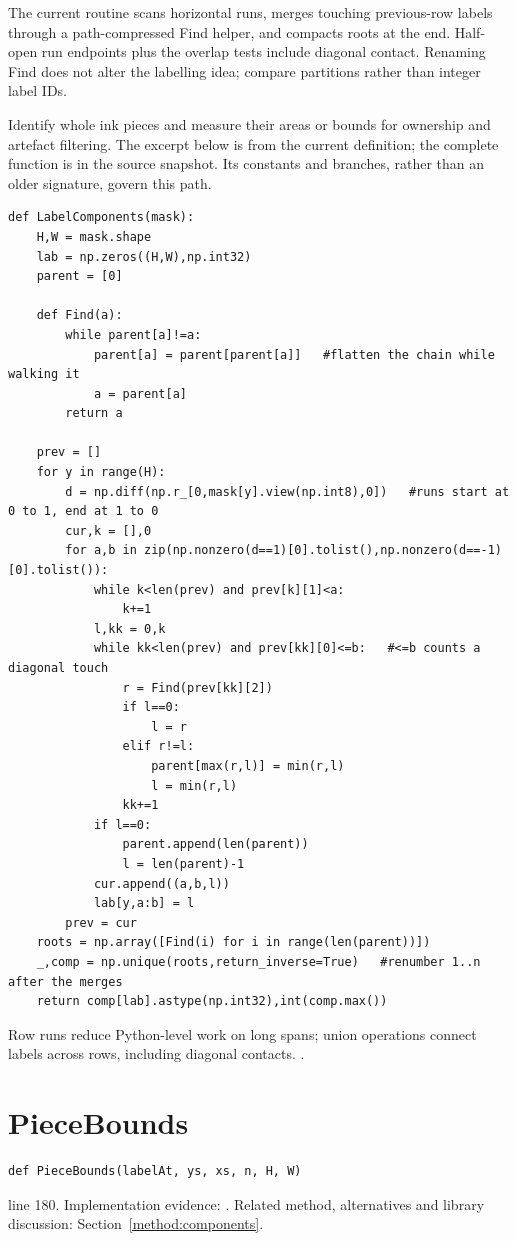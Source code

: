 The current routine scans horizontal runs, merges touching previous-row labels through a path-compressed Find helper, and compacts roots at the end. Half-open run endpoints plus the overlap tests include diagonal contact. Renaming Find does not alter the labelling idea; compare partitions rather than integer label IDs.


Identify whole ink pieces and measure their areas or bounds for ownership and artefact filtering. The excerpt below is from the current definition; the complete function is in the source snapshot. Its constants and branches, rather than an older signature, govern this path.


\begin{lstlisting}[style=plain]
def LabelComponents(mask):
    H,W = mask.shape
    lab = np.zeros((H,W),np.int32)
    parent = [0]

    def Find(a):
        while parent[a]!=a:
            parent[a] = parent[parent[a]]   #flatten the chain while walking it
            a = parent[a]
        return a

    prev = []
    for y in range(H):
        d = np.diff(np.r_[0,mask[y].view(np.int8),0])   #runs start at 0 to 1, end at 1 to 0
        cur,k = [],0
        for a,b in zip(np.nonzero(d==1)[0].tolist(),np.nonzero(d==-1)[0].tolist()):
            while k<len(prev) and prev[k][1]<a:
                k+=1
            l,kk = 0,k
            while kk<len(prev) and prev[kk][0]<=b:   #<=b counts a diagonal touch
                r = Find(prev[kk][2])
                if l==0:
                    l = r
                elif r!=l:
                    parent[max(r,l)] = min(r,l)
                    l = min(r,l)
                kk+=1
            if l==0:
                parent.append(len(parent))
                l = len(parent)-1
            cur.append((a,b,l))
            lab[y,a:b] = l
        prev = cur
    roots = np.array([Find(i) for i in range(len(parent))])
    _,comp = np.unique(roots,return_inverse=True)   #renumber 1..n after the merges
    return comp[lab].astype(np.int32),int(comp.max())
\end{lstlisting}
Row runs reduce Python-level work on long spans; union operations connect labels across rows, including diagonal contacts. \cite{he2008,tarjan1975,opencvshape,scipylabel}.


\section{PieceBounds}\label{fn:segment:PieceBounds}
\begin{lstlisting}[style=sig]
def PieceBounds(labelAt, ys, xs, n, H, W)
\end{lstlisting}
 line 180. Implementation evidence: \cite{code2026}. Related method, alternatives and library discussion: Section~\ref{method:components}.


